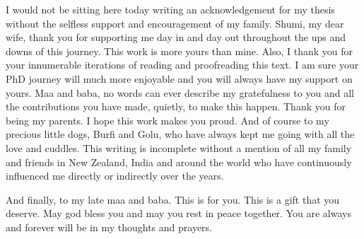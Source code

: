 I would not be sitting here today writing an acknowledgement for my thesis without the selfless support and encouragement of my family. Shumi, my dear wife, thank you for supporting me day in and day out throughout the ups and downs of this journey. This work is more yours than mine. Also, I thank you for your innumerable iterations of reading and proofreading this text. I am sure your PhD journey will much more enjoyable and you will always have my support on yours. Maa and baba, no words can ever describe my gratefulness to you and all the contributions you have made, quietly, to make this happen. Thank you for being my parents. I hope this work makes you proud. And of course to my precious little dogs, Burfi and Golu, who have always kept me going with all the love and cuddles. This writing is incomplete without a mention of all my family and friends in New Zealand, India and around the world who have continuously influenced me directly or indirectly over the years.

And finally, to my late maa and baba. This is for you. This is a gift that you deserve. May god bless you and may you rest in peace together. You are always and forever will be in my thoughts and prayers. 
